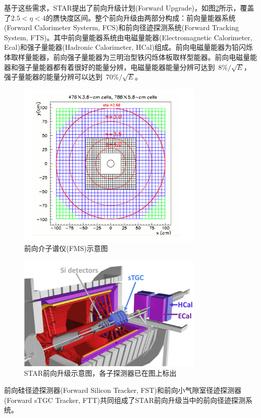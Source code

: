 基于这些需求，STAR提出了前向升级计划(Forward Upgrade)，如图\ref{fig:FWD}所示，覆盖了$ 2.5 < \eta < 4 $的赝快度区间。整个前向升级由两部分构成：前向量能器系统(Forward Calorimeter Systerm, FCS)和前向径迹探测系统(Forward Tracking System, FTS)。其中前向量能器系统由电磁量能器(Electromagnetic Calorimeter, Ecal)和强子量能器(Hadronic Calorimeter, HCal)组成。前向电磁量能器为铅闪烁体取样量能器，前向强子量能器为三明治型铁闪烁体板取样型能器。前向电磁量能器和强子量能器都有着很好的能量分辨，电磁量能器能量分辨可达到~$8\%/\sqrt{E}$，强子量能器的能量分辨可以达到~$70\%/\sqrt{E}$。
\begin{figure}[htb]
    \begin{center}
    \includegraphics[width=0.8\textwidth,clip]{figures/Chapter3/FMS.png}
    \end{center}
    \caption[前向介子谱仪(FMS)示意图]{前向介子谱仪(FMS)示意图}
    \label{fig:FMS}
\end{figure}
\begin{figure}[htb]
    \begin{center}
    \includegraphics[width=0.8\textwidth,clip]{figures/Chapter3/FWD.png}
    \end{center}
    \caption[STAR前向升级示意图]{STAR前向升级示意图，各子探测器已在图上标出}
    \label{fig:FWD}
\end{figure}
前向硅径迹探测器(Forward Silicon Tracker, FST)和前向小气隙室径迹探测器(Forward sTGC Tracker, FTT)共同组成了STAR前向升级当中的前向径迹探测系统。

